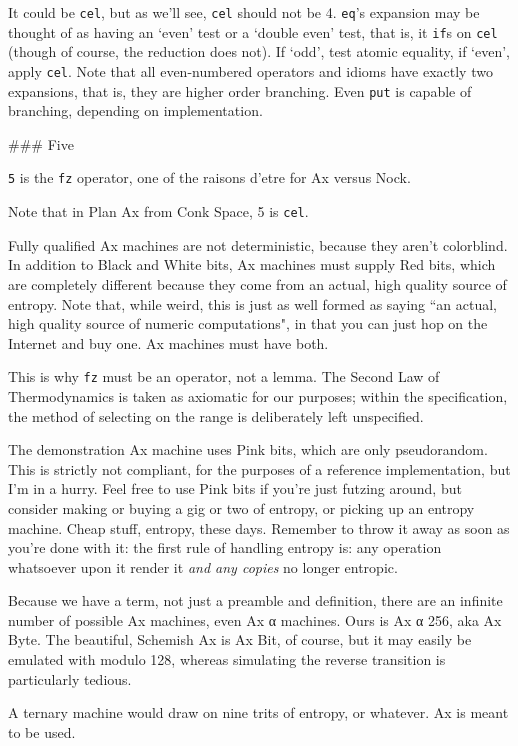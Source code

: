 \documentclass[twoside]{article}
\begin{document}
It could be \texttt{cel}, but as we'll see, \texttt{cel} should not be 4. \texttt{eq}'s expansion may be thought of as having an `even' test or a `double even' test, that is, it \texttt{if}s on \texttt{cel} (though of course, the reduction does not). If `odd', test atomic equality, if `even', apply \texttt{cel}. 
Note that all even-numbered operators and idioms have exactly two expansions, that is, they are higher order branching. Even \texttt{put} is capable of branching, depending on implementation.

### Five

\texttt{5} is the \texttt{fz} operator, one of the raisons d'etre for Ax versus Nock. 

Note that in Plan Ax from Conk Space, 5 is \texttt{cel}. 

Fully qualified Ax machines are not deterministic, because they aren't colorblind. In addition to Black and White bits, Ax machines must supply Red bits, which are completely different because they come from an actual, high quality source of entropy. Note that, while weird, this is just as well formed as saying ``an actual, high quality source of numeric computations", in that you can just hop on the Internet and buy one. Ax machines must have both.

This is why \texttt{fz} must be an operator, not a lemma. The Second Law of Thermodynamics is taken as axiomatic for our purposes; within the specification, the method of selecting on the range is deliberately left unspecified.

The demonstration Ax machine uses Pink bits, which are only pseudorandom. This is strictly not compliant, for the purposes of a reference implementation, but I'm in a hurry. Feel free to use Pink bits if you're just futzing around, but consider making or buying a gig or two of entropy, or picking up an entropy machine. Cheap stuff, entropy, these days. Remember to throw it away as soon as you're done with it: the first rule of handling entropy is: any operation whatsoever upon it render it \emph{and any copies} no longer entropic.

Because we have a term, not just a preamble and definition, there are an infinite number of possible Ax machines, even Ax α machines. Ours is Ax α 256, aka Ax Byte. The beautiful, Schemish Ax is Ax Bit, of course, but it may easily be emulated with modulo 128, whereas simulating the reverse transition is particularly tedious.

A ternary machine would draw on nine trits of entropy, or whatever. Ax is meant to be used. 
\end{document}
